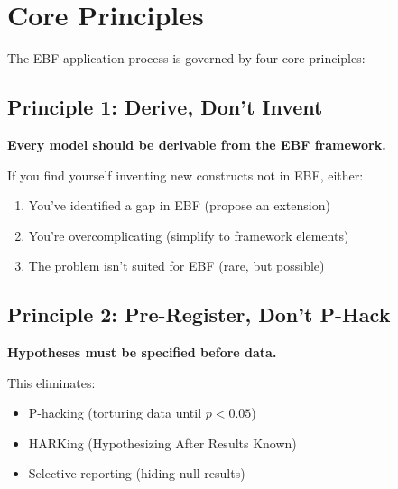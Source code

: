 
\section{Core Principles}
\label{sec:apply-principles}

The EBF application process is governed by four core principles:

\subsection{Principle 1: Derive, Don't Invent}

\begin{tcolorbox}[colback=blue!5!white, colframe=blue!75!black]
\textbf{Every model should be derivable from the EBF framework.}

If you find yourself inventing new constructs not in EBF, either:
\begin{enumerate}[nosep]
    \item You've identified a gap in EBF (propose an extension)
    \item You're overcomplicating (simplify to framework elements)
    \item The problem isn't suited for EBF (rare, but possible)
\end{enumerate}
\end{tcolorbox}

\subsection{Principle 2: Pre-Register, Don't P-Hack}

\begin{tcolorbox}[colback=blue!5!white, colframe=blue!75!black]
\textbf{Hypotheses must be specified before data.}

This eliminates:
\begin{itemize}[nosep]
    \item P-hacking (torturing data until $p < 0.05$)
    \item HARKing (Hypothesizing After Results Known)
    \item Selective reporting (hiding null results)
\end{itemize}
\end{tcolorbox}

